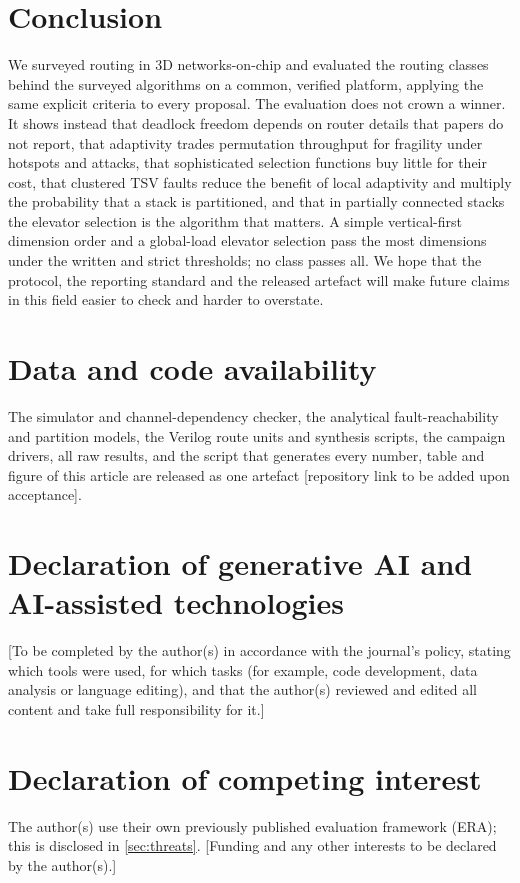 \section{Conclusion}
\label{sec:conclusion}

We surveyed routing in 3D networks-on-chip and evaluated the routing classes behind the surveyed algorithms on a common, verified platform, applying the same explicit criteria to every proposal. The evaluation does not crown a winner. It shows instead that deadlock freedom depends on router details that papers do not report, that adaptivity trades permutation throughput for fragility under hotspots and attacks, that sophisticated selection functions buy little for their cost, that clustered TSV faults reduce the benefit of local adaptivity and multiply the probability that a stack is partitioned, and that in partially connected stacks the elevator selection is the algorithm that matters. A simple vertical-first dimension order and a global-load elevator selection pass the most dimensions under the written and strict thresholds; no class passes all. We hope that the protocol, the reporting standard and the released artefact will make future claims in this field easier to check and harder to overstate.

\section*{Data and code availability}
The simulator and channel-dependency checker, the analytical fault-reachability and partition models, the Verilog route units and synthesis scripts, the campaign drivers, all raw results, and the script that generates every number, table and figure of this article are released as one artefact [repository link to be added upon acceptance].

\section*{Declaration of generative AI and AI-assisted technologies}
[To be completed by the author(s) in accordance with the journal's policy, stating which tools were used, for which tasks (for example, code development, data analysis or language editing), and that the author(s) reviewed and edited all content and take full responsibility for it.]

\section*{Declaration of competing interest}
The author(s) use their own previously published evaluation framework (ERA); this is disclosed in \cref{sec:threats}. [Funding and any other interests to be declared by the author(s).]
